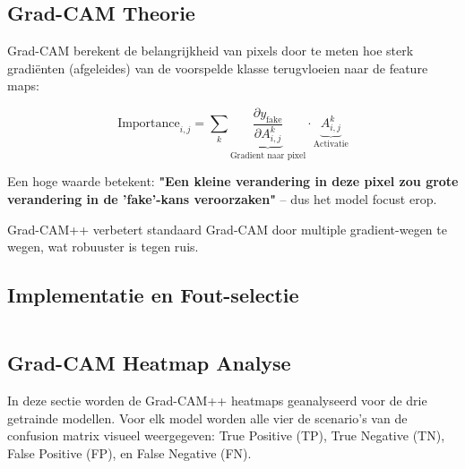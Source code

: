 \subsection{Grad-CAM Theorie}

Grad-CAM berekent de belangrijkheid van pixels door te meten hoe sterk gradiënten (afgeleides) van de voorspelde klasse terugvloeien naar de feature maps:

$$\text{Importance}_{i,j} = \sum_k \underbrace{\frac{\partial y_{\text{fake}}}{\partial A^k_{i,j}}}_{\text{Gradient naar pixel}} \cdot \underbrace{A^k_{i,j}}_{\text{Activatie}}$$

Een hoge waarde betekent: \textbf{"Een kleine verandering in deze pixel zou grote verandering in de 'fake'-kans veroorzaken"} – dus het model focust erop.

Grad-CAM++ verbetert standaard Grad-CAM door multiple gradient-wegen te wegen, wat robuuster is tegen ruis.

\subsection{Implementatie en Fout-selectie}

\begin{listing}[H]
    \inputminted[fontsize=\footnotesize, linenos, frame=lines]{python}{code/gradcam_impl.py}
    \caption{Python script voor de Grad-CAM++ implementatie.}
    \label{lst:gradcam_impl}
\end{listing}

\subsection{Grad-CAM Heatmap Analyse}

In deze sectie worden de Grad-CAM++ heatmaps geanalyseerd voor de drie getrainde modellen. Voor elk model worden alle vier de scenario's van de confusion matrix visueel weergegeven: True Positive (TP), True Negative (TN), False Positive (FP), en False Negative (FN).


